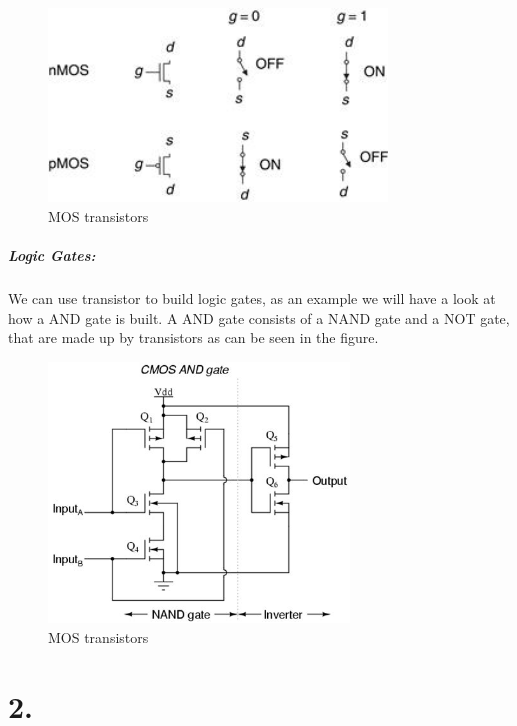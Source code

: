 \documentclass[a4paper]{report}
\begin{document}
\begin{figure}[h]
    \centering
    \includegraphics[width=9cm]{mosfet.jpg}
    \caption{MOS transistors}
\end{figure}

\paragraph{Logic Gates:} We can use transistor to build logic gates, as an example we will have a look at how a AND gate is
built. A AND gate consists of a NAND gate and a NOT gate, that are made up by transistors as can be seen in the figure.

\begin{figure}[h]
    \centering
    \includegraphics[width=8cm]{cmosAnd.jpeg}
    \caption{MOS transistors}
\end{figure}

\chapter{2.}
\end{document}
